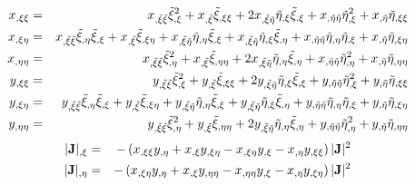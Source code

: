 \newcommand{\xxieta}{x_{,\xi\eta}}
\newcommand{\xetaeta}{x_{,\eta\eta}}
%
\newcommand{\yxixi}{y_{,\xi\xi}}
\newcommand{\yxieta}{y_{,\xi\eta}}
\newcommand{\yetaeta}{y_{,\eta\eta}}
%
\newcommand{\dxdxi}{x_{,\xi}}
\newcommand{\dydxi}{y_{,\xi}}
\newcommand{\dxdeta}{x_{,\eta}}
\newcommand{\dydeta}{y_{,\eta}}
%
\newcommand{\rjac}{|{\bf J}|}
\newcommand{\drjacdxi}{|{\bf J}|_{,\xi}}
\newcommand{\drjacdeta}{|{\bf J}|_{,\eta}}
%
\newcommand{\dsdxi}{\tilde\xi_{,\xi}}
\newcommand{\dsdeta}{\tilde\xi_{,\eta}}
\newcommand{\drdxi}{\tilde\eta_{,\xi}}
\newcommand{\drdeta}{\tilde\eta_{,\eta}}
%
\newcommand{\dsdxidxi}{ \tilde\xi_{,\xi\xi} }
\newcommand{\dsdxideta}{ \tilde\xi_{,\xi\eta} }
\newcommand{\dsdetadeta}{ \tilde\xi_{,\eta\eta} }
\newcommand{\drdxidxi}{ \tilde\eta_{,\xi\xi} }
\newcommand{\drdxideta}{ \tilde\eta_{,\xi\eta} }
\newcommand{\drdetadeta}{ \tilde\eta_{,\eta\eta} }
%
\newcommand{\dxds}{x_{,\tilde\xi} }
\newcommand{\dxdr}{x_{,\tilde\eta} }
\newcommand{\dyds}{y_{,\tilde\xi} }
\newcommand{\dydr}{y_{,\tilde\eta} }
%
\newcommand{\dxdsds}{x_{,\tilde\xi\tilde\xi} }
\newcommand{\dxdsdr}{x_{,\tilde\xi\tilde\eta} }
\newcommand{\dxdrdr}{x_{,\tilde\eta\tilde\eta} }
\newcommand{\dydsds}{y_{,\tilde\xi\tilde\xi} }
\newcommand{\dydsdr}{y_{,\tilde\xi\tilde\eta} }
\newcommand{\dydrdr}{y_{,\tilde\eta\tilde\eta} }
%
\begin{eqnarray}
\xxixi &=& \dxdsds \dsdxi^2 + \dxds \dsdxidxi + 2 \dxdsdr \drdxi \dsdxi + 
  \dxdrdr \drdxi^2 + \dxdr \drdxidxi \\
\xxieta &=& \dxdsds \dsdeta \dsdxi + \dxds \dsdxideta + \dxdsdr \drdeta \dsdxi
  + \dxdsdr \drdxi \dsdeta + \dxdrdr \drdeta \drdxi + \dxdr \drdxideta \\ 
\xetaeta &=& \dxdsds \dsdeta^2 + \dxds \dsdetadeta + 2 \dxdsdr \drdeta 
  \dsdeta + \dxdrdr \drdeta^2 + \dxdr \drdetadeta \\
\yxixi &=& \dydsds \dsdxi^2 + \dyds \dsdxidxi + 2 \dydsdr \drdxi \dsdxi + 
  \dydrdr \drdxi^2 + \dydr \drdxidxi \\
\yxieta &=& \dydsds \dsdeta \dsdxi + \dyds \dsdxideta + 
  \dydsdr \drdeta \dsdxi + \dydsdr \drdxi \dsdeta + \dydrdr \drdeta \drdxi + 
  \dydr \drdxideta \\
\yetaeta &=& \dydsds \dsdeta^2 + \dyds \dsdetadeta + 
  2 \dydsdr \drdeta \dsdeta + \dydrdr \drdeta^2 + \dydr \drdetadeta
\end{eqnarray}
%
\begin{eqnarray}
\drjacdxi & = & -\left( \xxixi\dydeta + \dxdxi\yxieta - 
                      \xxieta\dydxi - \dxdeta\yxixi \right ) \rjac^2 \\
\drjacdeta & = & -\left( \xxieta\dydeta + \dxdxi\yetaeta - 
                       \xetaeta\dydxi - \dxdeta\yxieta \right) \rjac^2
\end{eqnarray}
